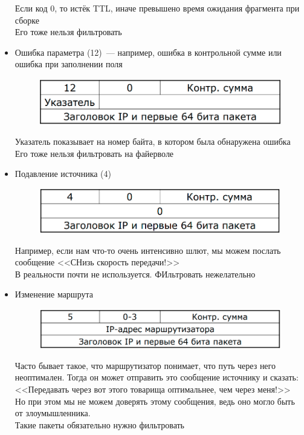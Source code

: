 \begin{itemize}
\begin{figure}[H]
    \end{figure}
    Если код 0, то истёк TTL, иначе превышено время ожидания фрагмента при сборке\\
    Его тоже нельзя фильтровать
    \item Ошибка параметра (12)~--- например, ошибка в контрольной сумме или ошибка при заполнении поля\\
    \begin{figure}[H]
        \centering
        \includegraphics[width=15cm]{images/02/12}
    \end{figure}
    Указатель показывает на номер байта, в котором была обнаружена ошибка\\
    Его тоже нельзя фильтровать на файерволе
\end{itemize}



\begin{itemize}
    \item Подавление источника (4)\\
    \begin{figure}[H]
        \centering
        \includegraphics[width=15cm]{images/02/13}
    \end{figure}
    Например, если нам что-то очень интенсивно шлют, мы можем послать сообщение <<СНизь скорость передачи!>>\\
    В реальности почти не используется. ФИльтровать нежелательно
    \item Изменение маршрута\\
    \begin{figure}[H]
        \centering
        \includegraphics[width=15cm]{images/02/14}
    \end{figure}
    Часто бывает такое, что маршрутизатор понимает, что путь через него неоптимален. Тогда он может отправить это сообщение источнику и сказать: <<Передавать через вот этого товарища оптимальнее, чем через меня!>>\\
    Но при этом мы не можем доверять этому сообщения, ведь оно могло быть от злоумышленника.\\
    Такие пакеты обязательно нужно фильтровать
\end{itemize}

